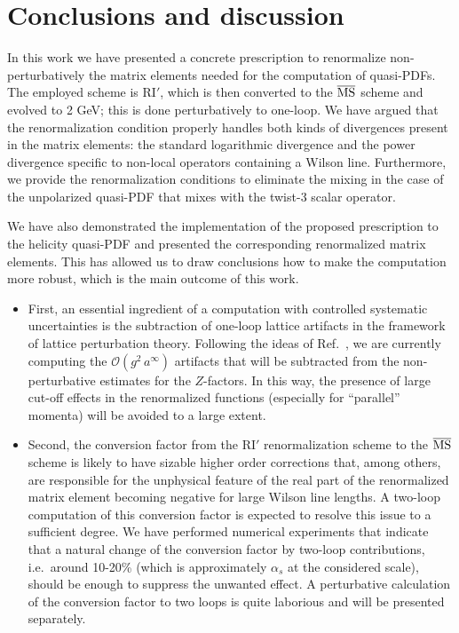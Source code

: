 \section{Conclusions and discussion}

In this work we have presented a concrete prescription to renormalize non-perturbatively the matrix elements needed
for the computation of quasi-PDFs. The employed scheme is RI$'$, which is then converted to the ${\overline{\rm MS}}$ scheme and evolved to 2 GeV; this is done
perturbatively to one-loop. We have argued that the renormalization condition properly handles both kinds of divergences present in the
matrix elements: the standard logarithmic divergence and the power divergence specific to non-local operators containing a Wilson line. Furthermore,
we provide the renormalization conditions to eliminate the mixing in the case of the unpolarized quasi-PDF that mixes with the twist-3 scalar operator.

\medskip
We have also demonstrated the implementation of the proposed prescription to the helicity quasi-PDF and presented the corresponding renormalized
matrix elements. This has allowed us to draw conclusions how to make the computation more robust, which is the main outcome of this work.
\begin{itemize}
\item First, an essential ingredient of a computation with controlled systematic uncertainties is the subtraction of one-loop lattice artifacts in the framework
of lattice perturbation theory.
Following the ideas of Ref.~\cite{Alexandrou:2015sea}, we are currently computing the $\mathcal{O}(g^2\,a^\infty)$ artifacts that will be subtracted
from the non-perturbative estimates for the $Z$-factors. In this way, the presence of large cut-off effects in the renormalized functions (especially
for ``parallel'' momenta) will be avoided to a large extent.
\item Second, the conversion factor from the RI$'$ renormalization scheme to the ${\overline{\rm MS}}$
scheme is likely to have sizable higher order corrections that, among others, are responsible for the unphysical feature of the real part of the renormalized
matrix element becoming negative for large Wilson line lengths. A two-loop computation of this conversion factor is expected to resolve this issue
to a sufficient degree. We have performed numerical experiments that indicate that a natural change of the conversion factor by two-loop contributions,
i.e.\ around 10-20\% (which is approximately $\alpha_s$ at the considered scale), should be enough to suppress the unwanted effect. A perturbative
calculation of the conversion factor to two loops is quite laborious and will be presented separately.
\end{itemize}

